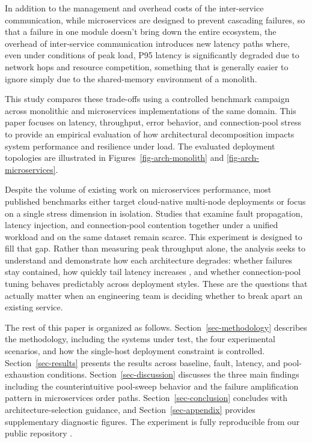 \documentclass[smallextended,natbib]{svjour3}
\begin{document}
In addition to the management and overhead costs of the inter-service communication, while microservices are designed to prevent cascading failures, so that a failure in one module doesn't bring down the entire ecosystem, the overhead of inter-service communication introduces new latency paths where, even under conditions of peak load, P95 latency is significantly degraded due to network hops and resource competition, something that is generally easier to ignore simply due to the shared-memory environment of a monolith.

This study compares these trade-offs using a controlled benchmark campaign across monolithic and microservices implementations of the same domain. This paper focuses on latency, throughput, error behavior, and connection-pool stress to provide an empirical evaluation of how architectural decomposition impacts system performance and resilience under load. The evaluated deployment topologies are illustrated in Figures~\ref{fig-arch-monolith} and \ref{fig-arch-microservices}.

Despite the volume of existing work on microservices performance, most published benchmarks either target cloud-native multi-node deployments or focus on a single stress dimension in isolation. Studies that examine fault propagation, latency injection, and connection-pool contention together under a unified workload and on the same dataset remain scarce. This experiment is designed to fill that gap. Rather than measuring peak throughput alone, the analysis seeks to understand and demonstrate how each architecture degrades: whether failures stay contained, how quickly tail latency increases , and whether connection-pool tuning behaves predictably across deployment styles. These are the questions that actually matter when an engineering team is deciding whether to break apart an existing service.

The rest of this paper is organized as follows. Section~\ref{sec-methodology} describes the methodology, including the systems under test, the four experimental scenarios, and how the single-host deployment constraint is controlled. Section~\ref{sec-results} presents the results across baseline, fault, latency, and pool-exhaustion conditions. Section~\ref{sec-discussion} discusses the three main findings including the counterintuitive pool-sweep behavior and the failure amplification pattern in microservices order paths. Section~\ref{sec-conclusion} concludes with architecture-selection guidance, and Section~\ref{sec-appendix} provides supplementary diagnostic figures. The experiment is fully reproducible from our public repository \cite{repo_artifact}.
\end{document}
